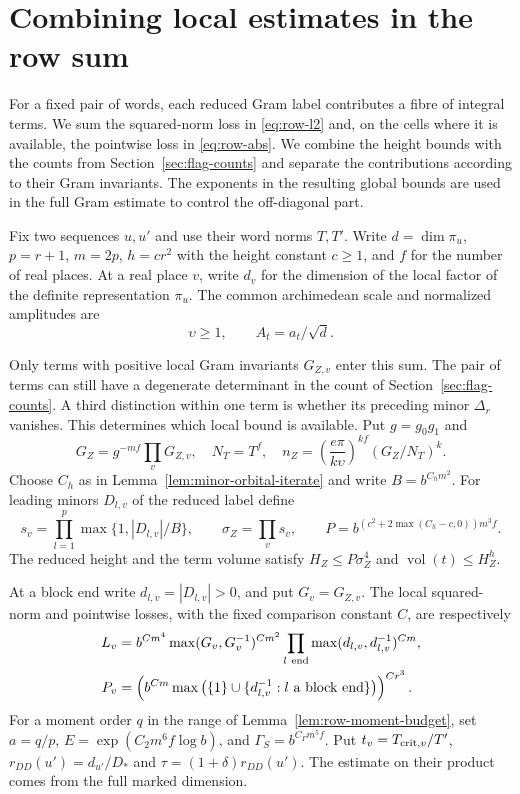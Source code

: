 \section{Combining local estimates in the row sum}
\label{sec:row-sums}

For a fixed pair of words, each reduced Gram label contributes a fibre of integral terms. We sum the squared-norm loss in \eqref{eq:row-l2} and, on the cells where it is available, the pointwise loss in \eqref{eq:row-abs}. We combine the
height bounds with the counts from Section~\ref{sec:flag-counts}
and separate the contributions according to their Gram
invariants. The exponents in the resulting global bounds are
used in the full Gram estimate to control the off-diagonal
part.

Fix two sequences \(u,u'\) and use their word norms \(T,T'\).
Write \(d=\dim\pi_u\), \(p=r+1\), \(m=2p\), \(h=cr^2\)
with the height constant \(c\ge1\), and \(f\) for the number of real
places. At a real place \(v\), write \(d_v\) for the dimension of the local factor of the definite representation \(\pi_u\). The common
archimedean scale and normalized amplitudes are
\[
              \upsilon\ge1,\qquad A_t=a_t/\sqrt d .
\]

Only terms with positive local Gram invariants \(G_{Z,v}\) enter this
sum. The pair of terms can still have a degenerate determinant in the
count of Section~\ref{sec:flag-counts}. A third distinction within
one term is whether its preceding minor \(\Delta_r\) vanishes. This
determines which local bound is available. Put \(g=g_0g_1\) and
\[
 G_Z=g^{-mf}\prod_vG_{Z,v},\quad N_T=T^f,\quad
 n_Z=\left(\frac{e\pi}{k\upsilon}\right)^{kf}(G_Z/N_T)^k .
\]
Choose \(C_h\) as in Lemma~\ref{lem:minor-orbital-iterate}
and write \(B=b^{C_hm^2}\). For leading minors \(D_{l,v}\) of the
reduced label define
\[
 s_v=\prod_{l=1}^{p}\max\{1,|D_{l,v}|/B\},\qquad
 \sigma_Z=\prod_vs_v,\qquad
 P=b^{(c^2+2\max(C_h-c,0))m^3 f}.
\]
The reduced height and the term volume satisfy
\(H_Z\le P\sigma_Z^4\) and \(\operatorname{vol}(t)\le H_Z^h\).

At a block end write \(d_{l,v}=|D_{l,v}|>0\), and put
\(G_v=G_{Z,v}\). The local squared-norm and pointwise losses, with
the fixed comparison constant \(C\), are respectively
\[
 \begin{aligned}
 L_v&=b^{Cm^4}\max(G_v,G_v^{-1})^{Cm^2}
           \prod_{l\ {\rm end}}\max(d_{l,v},d_{l,v}^{-1})^{Cm},\\
 P_v&=\left(b^{Cm}\max\big(\{1\}\cup
                 \{d_{l,v}^{-1}:l\text{ a block end}\}\big)\right)^{Cr^3}.
 \end{aligned}
\]
For a moment order \(q\) in the range of Lemma~\ref{lem:row-moment-budget}, set \(a=q/p\),
\(E=\exp(C_2m^6 f\log b)\), and \(\Gamma_S=b^{C_\Gamma m^5f}\).
Put \(t_v=T_{{\rm crit},v}/T'\), \(r_{DD}(u')=d_{u'}/D_*\) and \(\tau=(1+\delta)r_{DD}(u')\). The estimate on their product comes from the full marked dimension.

